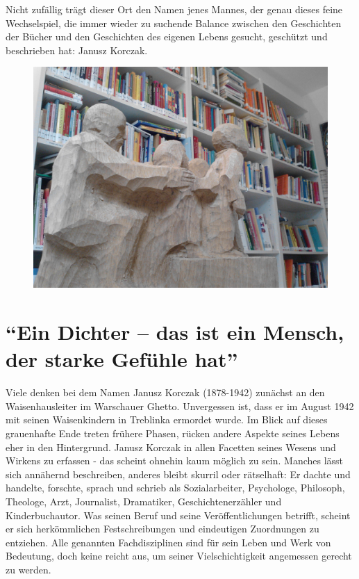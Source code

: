\documentclass[a4paper,
fontsize=11pt,
oneside,
numbers=noperiodatend,
parskip=half-,
bibliography=totoc,
final
]{scrartcl}
\begin{document}
Nicht zufällig trägt dieser Ort den Namen jenes Mannes, der genau dieses
feine Wechselspiel, die immer wieder zu suchende Balance zwischen den
Geschichten der Bücher und den Geschichten des eigenen Lebens gesucht,
geschützt und beschrieben hat: Janusz Korczak.

\begin{figure}
\centering
\includegraphics{img/abbildung2.jpg}
\end{figure}

\section*{\texorpdfstring{\enquote{Ein Dichter -- das ist ein
Mensch, der starke Gefühle
hat}}{Ein Dichter -- das ist ein Mensch, der starke Gefühle hat}}\label{ein-dichter-das-ist-ein-mensch-der-starke-gefuxfchle-hat}

Viele denken bei dem Namen Janusz Korczak (1878-1942) zunächst an den
Waisenhausleiter im Warschauer Ghetto. Unvergessen ist, dass er im
August 1942 mit seinen Waisenkindern in Treblinka ermordet wurde. Im
Blick auf dieses grauenhafte Ende treten frühere Phasen, rücken andere
Aspekte seines Lebens eher in den Hintergrund. Janusz Korczak in allen
Facetten seines Wesens und Wirkens zu erfassen - das scheint ohnehin
kaum möglich zu sein. Manches lässt sich annähernd beschreiben, anderes
bleibt skurril oder rätselhaft: Er dachte und handelte, forschte, sprach
und schrieb als Sozialarbeiter, Psychologe, Philosoph, Theologe, Arzt,
Journalist, Dramatiker, Geschichtenerzähler und Kinderbuchautor. Was
seinen Beruf und seine Veröffentlichungen betrifft, scheint er sich
herkömmlichen Festschreibungen und eindeutigen Zuordnungen zu entziehen.
Alle genannten Fachdisziplinen sind für sein Leben und Werk von
Bedeutung, doch keine reicht aus, um seiner Vielschichtigkeit angemessen
gerecht zu werden.
\end{document}
